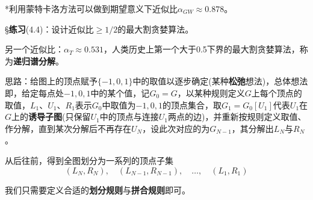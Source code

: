 \documentclass[a4paper,UTF8,fontset=windows]{ctexart}
\newcommand{\exce}[2]{\S\textbf{练习}(#1)：{\kaishu #2}}
\begin{document}
*利用蒙特卡洛方法可以做到期望意义下近似比$\alpha_{GW}\approx 0.878$。

\exce{4.4}{设计近似比$\ge1/2$的最大割贪婪算法。}

另一个近似比：$\alpha_T\approx0.531$，人类历史上第一个大于0.5下界的最大割贪婪算法，称为\textbf{递归谱分解}。

思路：给图上的顶点赋予$\{-1,0,1\}$中的取值以逐步确定(某种\textbf{松弛}想法)，总体想法即，给定每点处$-1,0,1$中的某个值，记$G_0=G$，以某种规则定义$G$上每个顶点的取值，$L_1$、$U_1$、$R_1$表示$G_0$中取值为$-1,0,1$的顶点集合，取$G_1=G_0[U_1]$代表$U_1$在$G$上的\textbf{诱导子图}(只保留$U_1$中的顶点与连接$U_1$两点的边)，并重新按规则定义取值、作分解，直到某次分解后不再存在$U_N$，设此次对应的为$G_{N-1}$，其分解出$L_N$与$R_N$。

从后往前，得到全图划分为一系列的顶点子集
$$(L_N,R_N),\quad(L_{N-1},R_{N-1}),\quad\dots,\quad(L_1,R_1)$$

我们只需要定义合适的\textbf{划分规则}与\textbf{拼合规则}即可。
\end{document}
